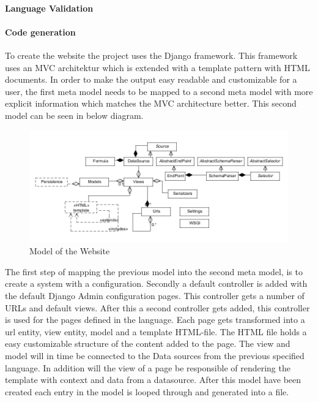 \paragraph{Language Validation}

\paragraph{Code generation}
To create the website the project uses the Django framework. 
This framework uses an MVC architektur which is extended with a template pattern with HTML documents. 
In order to make the output easy readable and customizable for a user, the first meta model needs to be mapped to a second meta model with more explicit information which matches the MVC architecture better.
This second model can be seen in below diagram. 

\begin{figure}
\begin{center}
\includegraphics[width=\linewidth]{images/websitemodel}
\end{center}
\caption{Model of the Website}
\label{fig:websitemodel}
\end{figure}

The first step of mapping the previous model into the second meta model, is to create a system with a configuration. 
Secondly a default controller is added with the default Django Admin configuration pages. 
This controller gets a number of URLs and default views. 
After this a second controller gets added, this controller is used for the pages defined in the language. 
Each page gets transformed into a url entity, view entity, model and a template HTML-file.
The HTML file holds a easy customizable structure of the content added to the page. The view and model will in time be connected to the Data sources from the previous specified language. 
In addition will the view of a page be responsible of rendering the template with context and data from a datasource. 
After this model have been created each entry in the model is looped through and generated into a file.



